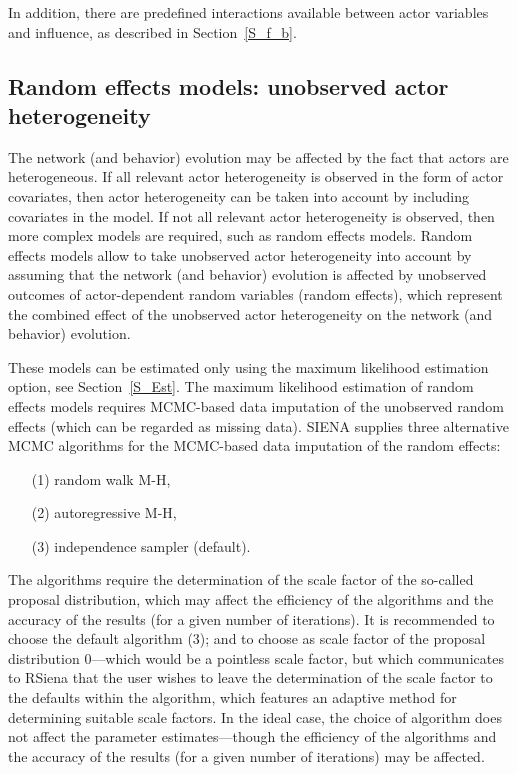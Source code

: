 \documentclass[a4paper,fleqn,11pt]{article}
\newcommand{\+}{\, + \,}
\newcommand{\RS}{{\sf \textsf{RSiena} }}
\newcommand{\SI}{{\sf SIENA }}
\begin{document}
In addition, there are predefined interactions available
between actor variables and influence, as described in Section~\ref{S_f_b}.

\iffalse
\subsection{Random effects models: unobserved actor heterogeneity}

The network (and behavior) evolution may be affected
by the fact that actors are heterogeneous.
If all relevant actor heterogeneity is observed in the form of actor
covariates,
then actor heterogeneity can be taken into account by including
covariates in the model.
If not all relevant actor heterogeneity is observed,
then more complex models are required, such as random effects models.
Random effects models \citep[see][]{SchweinbergerSnijders07b} allow to take
unobserved actor heterogeneity into account
by assuming that the network (and behavior) evolution is affected
by unobserved
outcomes of actor-dependent random variables (random effects),
which represent the combined effect of the unobserved actor
heterogeneity on the network (and behavior) evolution.

These models can be estimated only using the maximum likelihood
estimation option, see Section~\ref{S_Est}.
The maximum likelihood estimation of random effects models requires
MCMC-based data
imputation of the unobserved random effects (which can be regarded
as missing data).
\SI supplies three alternative MCMC algorithms for the MCMC-based
data imputation of the random effects:
\begin{itemize}
\item[(1)] random walk M-H,
\item[(2)] autoregressive M-H,
\item[(3)] independence sampler (default).
\end{itemize}
The algorithms require the determination of the scale factor of
the so-called proposal distribution,
which may affect the efficiency of the algorithms and
the accuracy of the results (for a given number of iterations).
It is recommended to choose the default algorithm (3);
and to choose as scale factor of the proposal distribution $0$---which
would be a pointless scale factor, but which communicates to \RS
that the user wishes to leave the determination of the scale factor to
the defaults within the algorithm,
which features an adaptive method for determining suitable scale factors.
In the ideal case, the choice of algorithm does not affect the
parameter estimates---though the efficiency of
the algorithms and the accuracy of the results
(for a given number of iterations) may be affected.
\end{document}
